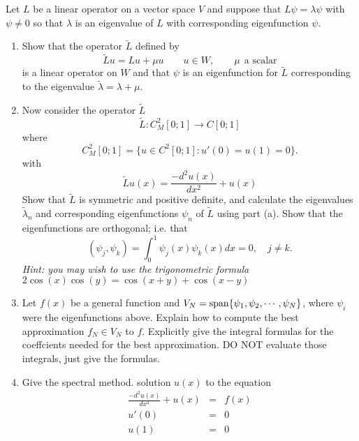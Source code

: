 
Let $L$ be a linear operator on a vector space $V$ and suppose that $L\psi=\lambda \psi$ with $\psi \neq 0$ so that $\lambda$ is an eigenvalue of $L$ with corresponding eigenfunction $\psi$.
\begin{enumerate}
\item Show that the operator $\tilde{L}$ defined by
\[
\tilde{L}u = Lu + \mu u \qquad u \in W, \qquad \mu \:\: \mbox{a scalar}
\]
is a linear operator on $W$ and that $\psi$ is an eigenfunction for $\tilde{L}$ corresponding to the eigenvalue $\tilde{\lambda}= \lambda + \mu$. 
\item Now consider the operator $\tilde{L}$
\[
\tilde{L} : C^2_M [0; 1] \rightarrow C[0; 1]\]
where
\[
 C^2_M [0; 1] = \{u \in C^2[0; 1] : u'(0) = u(1) = 0\}.
 \]
 with
\[
\tilde{L}u(x) = \frac{-d^2u(x)}{dx^2}+ u(x)
\]
Show that $\tilde{L}$ is symmetric and positive definite, and calculate the eigenvalues $\tilde{\lambda}_n$ and corresponding eigenfunctions $\psi_n$ of $\tilde{L}$ using part (a).  Show that the eigenfunctions are orthogonal; i.e. that 
\[
(\psi_j,\psi_k) = \int_0^1 \psi_j(x) \psi_k(x) dx = 0, \quad j \neq k.
\]
\emph{Hint: you may wish to use the trigonometric formula $2\cos(x)\cos(y) = \cos(x+ y) + \cos(x-y)$ }

\item  Let $f(x)$ be a general function and $V_N= {\rm span}\{\psi_1, \psi_2, \cdots, \psi_N\}$, where $\psi_i$ were the eigenfunctions above.  Explain how to compute the best approximation $f_N \in V_N$ to $f$. Explicitly give the integral formulas for the coeffcients needed for the best approximation. DO NOT evaluate those integrals, just give the formulas.

\item Give the spectral method. solution $u(x)$ to the equation 
\begin{eqnarray*}
\frac{-d^2u(x)}{dx^2}+ u(x) &=& f(x) \\
                        u'(0) &=& 0\\
                        u(1) &=& 0
\end{eqnarray*}



\end{enumerate}


